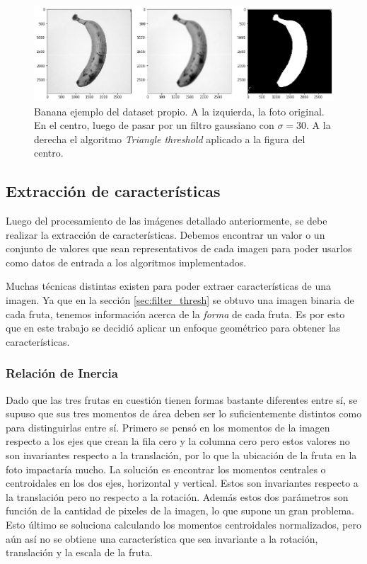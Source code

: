 \documentclass[10pt, a4paper]{article}
\begin{document}
\begin{figure}[h]
    \centering
    \includegraphics[width=\textwidth]{original_gauss_thresh_banana.png}
    \caption{Banana ejemplo del dataset propio. A la izquierda, la foto original. En el centro, luego de pasar por un filtro gaussiano con $\sigma = 30$. A la derecha el algoritmo \textit{Triangle threshold} aplicado a la figura del centro.}
    \label{fig:orig_gauss_thresh}
\end{figure}

\subsection{Extracción de características}

Luego del procesamiento de las imágenes detallado anteriormente, se debe realizar la extracción de características. Debemos encontrar un valor o un conjunto de valores que sean representativos de cada imagen para poder usarlos como datos de entrada a los algoritmos implementados. 

Muchas técnicas distintas existen para poder extraer características de una imagen. Ya que en la sección \ref{sec:filter_thresh} se obtuvo una imagen binaria de cada fruta, tenemos información acerca de la \textit{forma} de cada fruta. Es por esto que en este trabajo se decidió aplicar un enfoque geométrico para obtener las características.

\subsubsection{Relación de Inercia}

Dado que las tres frutas en cuestión tienen formas bastante diferentes entre sí, se supuso que sus tres momentos de área deben ser lo suficientemente distintos como para distinguirlas entre sí. Primero se pensó en los momentos de la imagen respecto a los ejes que crean la fila cero y la columna cero pero estos valores no son invariantes respecto a la translación, por lo que la ubicación de la fruta en la foto impactaría mucho. La solución es encontrar los momentos centrales o centroidales en los dos ejes, horizontal y vertical. Estos son invariantes respecto a la translación pero  no respecto a la rotación. Además estos dos parámetros son función de la cantidad de pixeles de la imagen, lo que supone un gran problema. Esto último se soluciona calculando los momentos centroidales normalizados, pero aún así no se obtiene una característica que sea invariante a la rotación, translación y la escala de la fruta. 
\end{document}
